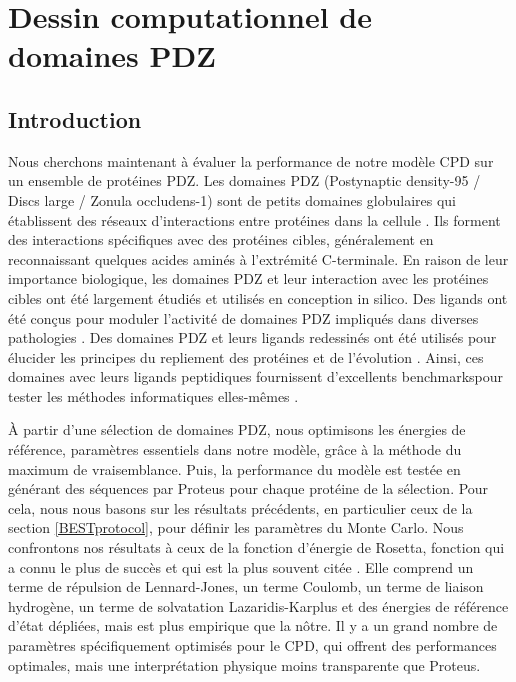 \chapter{Dessin computationnel de domaines PDZ}
\label{chap:PDZ}

\section{Introduction}

Nous cherchons maintenant à évaluer la performance de notre modèle CPD sur un ensemble de protéines PDZ. Les domaines PDZ (\og Postynaptic density-95 / Discs large / Zonula occludens-1\fg) sont de petits domaines globulaires qui établissent des réseaux d'interactions entre protéines dans la cellule \citep{Harris01,Hung02,Tonikian08,Gfeller11,Subbaiah11}. Ils forment des interactions spécifiques avec des protéines cibles, généralement en reconnaissant quelques acides aminés à l'extrémité C-terminale. En raison de leur importance biologique, les domaines PDZ et leur interaction avec les protéines cibles ont été largement étudiés et utilisés en conception in silico. Des ligands ont été conçus  pour moduler l'activité de domaines PDZ impliqués dans diverses pathologies \citep{Roberts12,Zheng15}. Des domaines  PDZ et leurs  ligands redessinés ont été utilisés pour élucider les principes du repliement des protéines et de l'évolution \cite{Kong09,Mclaughlin12,Melero14}. Ainsi, ces domaines avec leurs ligands peptidiques fournissent d'excellents \og benchmarks\fg pour tester les méthodes informatiques elles-mêmes \cite{Reina02,Smith10}.

À partir d'une sélection de domaines PDZ, nous optimisons les énergies de référence, paramètres essentiels dans notre modèle, grâce à la méthode du maximum de vraisemblance. Puis, la performance du modèle est testée en générant des séquences par Proteus pour chaque protéine de la sélection. Pour cela, nous nous basons sur les résultats précédents, en particulier ceux de la section \ref{BESTprotocol}, pour définir les paramètres du Monte Carlo. Nous confrontons nos résultats à ceux de la fonction d'énergie de Rosetta, fonction qui a connu le plus de succès et qui est la plus souvent citée \cite{Baker06}. Elle comprend un terme de répulsion de Lennard-Jones, un terme Coulomb, un terme de liaison hydrogène, un terme de solvatation Lazaridis-Karplus et des énergies de référence d'état dépliées, mais est plus empirique que la nôtre. Il y a un grand nombre de paramètres spécifiquement optimisés pour le CPD, qui offrent des performances optimales, mais une interprétation physique moins transparente que Proteus.
   
